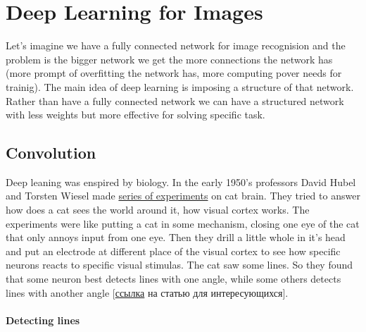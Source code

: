 \chapter{Deep Learning for Images}

{\sf %
Let's imagine we have a fully connected network for image recognision and the problem is the bigger network we get the more connections the network has (more prompt of overfitting the network has, more computing pover needs for trainig). The main idea of deep learning is imposing a structure of that network. Rather than have a fully connected network we can have a structured network with less weights but more effective for solving specific task.}

\section{Convolution}

Deep leaning was enspired by biology. In the early 1950's professors David Hubel and Torsten Wiesel made \href{https://youtu.be/IOHayh06LJ4}{series of experiments} on cat brain. They tried to answer how does a cat sees the world around it, how visual cortex works. The experiments were like putting a cat in some mechanism, closing one eye of the cat that only annoys input from one eye. Then they drill a little whole in it's head and put an electrode at different place of the visual cortex to see how specific neurons reacts to specific visual stimulas. The cat saw some lines. So they found that some neuron best detects lines with one angle, while some others detects lines with another angle [\href{https://www.ncbi.nlm.nih.gov/pmc/articles/PMC1363130/pdf/jphysiol01298-0128.pdf}{ссылка} на статью для интересующихся].

\subsubsection*{Detecting lines}


